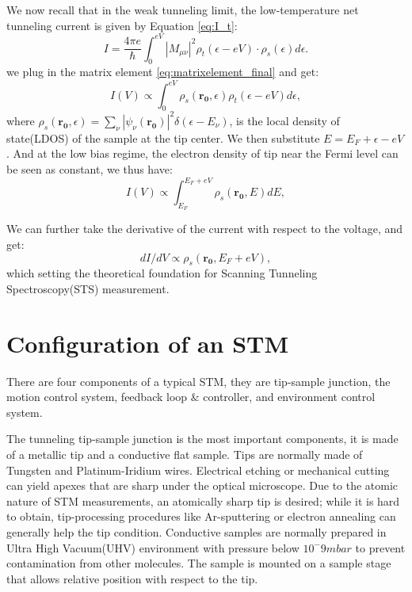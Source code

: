 We now recall that in the weak tunneling limit, the low-temperature net tunneling current is given by Equation \ref{eq:I_t}:
\begin{equation}
	I = \frac{4\pi e}{\hslash} \int_0^{eV}|M_{\mu \nu}|^2 \rho_t(\epsilon - eV) \cdot \rho_s(\epsilon) d\epsilon.
\end{equation}
we plug in the matrix element \ref{eq:matrixelement_final} and get:
\begin{equation}
	I(V) \propto \int_0^{eV}  \rho_s(\mathbf{r_0},\epsilon) \rho_t(\epsilon-eV) d\epsilon,
\end{equation}
where $\rho_s(\mathbf{r_0},\epsilon) = \sum_{\nu} |\psi_{\nu}(\mathbf{r_0})|^2 \delta(\epsilon - E_{\nu})$, is the local density of state(LDOS) of the sample at the tip center. We then substitute $E = E_F+ \epsilon - eV$. And at the low bias regime, the electron density of tip near the Fermi level can be seen as constant, we thus have: 
\begin{equation}
	I(V) \propto \int_{E_F}^{E_F+ eV}  \rho_s(\mathbf{r_0},E) dE,
\end{equation}

We can further take the derivative of the current with respect to the voltage, and get: 
\begin{equation}
	dI/dV \propto \rho_s(\mathbf{r_0},E_F + eV),
\end{equation}
which setting the theoretical foundation for Scanning Tunneling Spectroscopy(STS) measurement. 

\section{Configuration of an STM}
There are four components of a typical STM, they are tip-sample junction, the motion control system, feedback loop $\&$ controller, and environment control system. 

The tunneling tip-sample junction is the most important components, it is made of a metallic tip and a conductive flat sample. Tips are normally made of Tungsten and Platinum-Iridium wires. Electrical etching or mechanical cutting can yield apexes that are sharp under the optical microscope. Due to the atomic nature of \ac{STM} measurements, an atomically sharp tip is desired; while it is hard to obtain, tip-processing procedures like Ar-sputtering or electron annealing can generally help the tip condition. Conductive samples are normally prepared in Ultra High Vacuum(UHV) environment with pressure below $10^-9 mbar$ to prevent contamination from other molecules. The sample is mounted on a sample stage that allows relative position with respect to the tip. 

